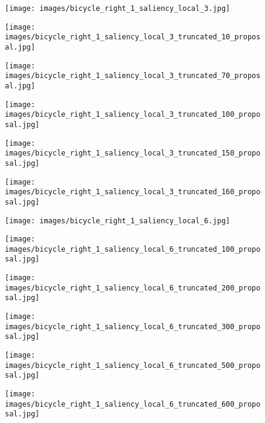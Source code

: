 \documentclass[runningheads]{llncs}
\begin{document}
\begin{figure*}[tb]
\begin{center}
		\begin{subfigure}{0.135\textwidth}
			\texttt{[image: images/bicycle\_right\_1\_saliency\_local\_3.jpg]}
		\end{subfigure}
		\begin{subfigure}{0.135\textwidth}
			\texttt{[image: images/bicycle\_right\_1\_saliency\_local\_3\_truncated\_10\_proposal.jpg]}
		\end{subfigure}
\begin{subfigure}{0.135\textwidth}
			\texttt{[image: images/bicycle\_right\_1\_saliency\_local\_3\_truncated\_70\_proposal.jpg]}
		\end{subfigure}
		\begin{subfigure}{0.135\textwidth}
			\texttt{[image: images/bicycle\_right\_1\_saliency\_local\_3\_truncated\_100\_proposal.jpg]}
		\end{subfigure}
		\begin{subfigure}{0.135\textwidth}
			\texttt{[image: images/bicycle\_right\_1\_saliency\_local\_3\_truncated\_150\_proposal.jpg]}
		\end{subfigure}
		\begin{subfigure}{0.135\textwidth}
			\texttt{[image: images/bicycle\_right\_1\_saliency\_local\_3\_truncated\_160\_proposal.jpg]}
		\end{subfigure}
		
		\begin{subfigure}{0.135\textwidth}
			\texttt{[image: images/bicycle\_right\_1\_saliency\_local\_6.jpg]}
		\end{subfigure}
\begin{subfigure}{0.135\textwidth}
			\texttt{[image: images/bicycle\_right\_1\_saliency\_local\_6\_truncated\_100\_proposal.jpg]}
		\end{subfigure}
		\begin{subfigure}{0.135\textwidth}
			\texttt{[image: images/bicycle\_right\_1\_saliency\_local\_6\_truncated\_200\_proposal.jpg]}
		\end{subfigure}
		\begin{subfigure}{0.135\textwidth}
			\texttt{[image: images/bicycle\_right\_1\_saliency\_local\_6\_truncated\_300\_proposal.jpg]}
		\end{subfigure}
		\begin{subfigure}{0.135\textwidth}
			\texttt{[image: images/bicycle\_right\_1\_saliency\_local\_6\_truncated\_500\_proposal.jpg]}
		\end{subfigure}
		\begin{subfigure}{0.135\textwidth}
			\texttt{[image: images/bicycle\_right\_1\_saliency\_local\_6\_truncated\_600\_proposal.jpg]}
		\end{subfigure}
		

\end{center}
\end{figure*}
\end{document}
